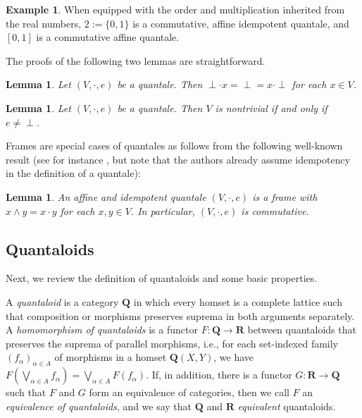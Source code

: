 \documentclass[12pt]{tac}
\newtheorem{lemma}[theorem]{Lemma}
\theoremstyle{definition}
\newtheorem{example}[theorem]{Example}
\theoremstyle{remark}
\newcommand{\<}{\langle}
\renewcommand{\>}{\rangle}
\renewcommand{\:}{\colon}
\begin{document}
\begin{example}\label{ex:quantales}When equipped with the order and multiplication inherited from the real numbers, $2:=\{0,1\}$ is a commutative, affine idempotent quantale, and $[0,1]$ is a commutative affine quantale. 
\end{example}


    The proofs of the following two lemmas are straightforward.
\begin{lemma}\label{lem:multiplication with bottom in quantale}
    Let $(V,\cdot,e)$ be a quantale. Then ${\perp}\cdot x=\perp =x\cdot{\perp}
    $ for each $x\in V$.
\end{lemma}
    
\begin{lemma}
    Let $(V,\cdot,e)$ be a quantale. Then $V$ is nontrivial if and only if $e\neq\perp$.
\end{lemma}

Frames are special cases of quantales as follows from the following well-known result (see for instance \cite[Corollary 2]{BorceuxBossche1986}, but note that the authors already assume idempotency in the definition of a quantale):
\begin{lemma}\label{lem:affine-idempotent-quantale-is-frame}
    An affine and idempotent quantale $(V,\cdot,e)$ is a frame with $x\wedge y=x\cdot y$ for each $x,y\in V$. In particular, $(V,\cdot,e)$ is commutative.
\end{lemma}


\subsection{Quantaloids}




Next, we review the definition of quantaloids and some basic properties.


    A \emph{quantaloid} is a category $\mathbf Q$  in which every homset is a complete lattice such that composition or morphisms preserves suprema in both arguments separately. A \emph{homomorphism of quantaloids} is a functor $F:\mathbf Q\to\mathbf R$ between quantaloids that preserves the suprema of parallel morphisms, i.e., for each set-indexed family $(f_\alpha)_{\alpha\in A}$ of morphisms in a homset $\mathbf Q(X,Y)$, we have $F(\bigvee_{\alpha\in A}f_\alpha)=\bigvee_{\alpha\in A}F(f_\alpha)$. If, in addition, there is a functor $G:\mathbf R\to\mathbf Q$ such that $F$ and $G$ form an equivalence of categories, then we call $F$ an \emph{equivalence of quantaloids}, and we say that $\mathbf Q$ and $\mathbf R$ \emph{equivalent} quantaloids.
\end{document}
